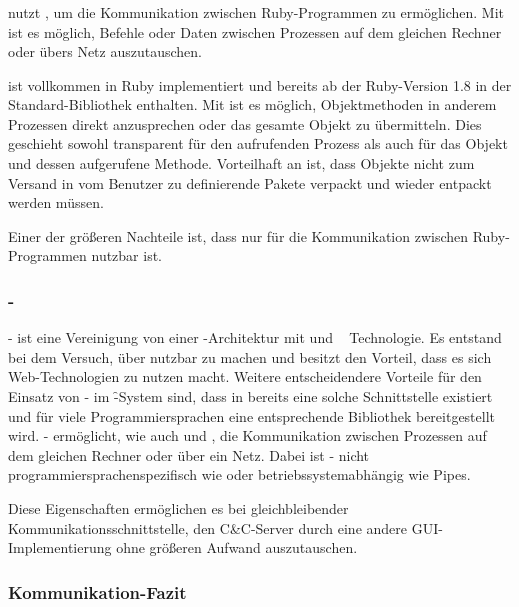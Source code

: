 \subsubsection*{}
\label{subsec:drb}

 nutzt , um die Kommunikation zwischen Ruby-Programmen zu
ermöglichen. Mit  ist es möglich, Befehle oder Daten zwischen
Prozessen auf dem gleichen Rechner oder übers Netz auszutauschen.

 ist vollkommen in Ruby implementiert und bereits ab der
Ruby-Version 1.8 in der Standard-Bibliothek enthalten. Mit 
ist es möglich, Objektmethoden in anderem Prozessen direkt
anzusprechen oder das gesamte Objekt zu übermitteln. Dies geschieht
sowohl transparent für den aufrufenden Prozess als auch für das Objekt
und dessen aufgerufene Methode. Vorteilhaft an  ist, dass
Objekte nicht zum Versand in vom Benutzer zu definierende Pakete
verpackt und wieder entpackt werden müssen.

Einer der größeren Nachteile ist, dass  nur für die Kommunikation
zwischen Ruby-Programmen nutzbar ist.

\subsubsection*{-}
\label{subsec:xmlrpc}

- ist eine Vereinigung von einer
-Architektur mit  und ~\cite{rfc2068}
Technologie. Es entstand bei dem Versuch,  über 
nutzbar zu machen und besitzt den Vorteil, dass es sich Web-Technologien
zu nutzen macht. Weitere entscheidendere Vorteile für den Einsatz von
- im \f-System sind, dass in  bereits eine
solche Schnittstelle existiert und für viele Programmiersprachen
eine entsprechende Bibliothek bereitgestellt wird. -
ermöglicht, wie auch  und , die Kommunikation
zwischen Prozessen auf dem gleichen Rechner oder über ein Netz. Dabei
ist - nicht programmiersprachenspezifisch wie
 oder betriebssystemabhängig wie Pipes.

Diese Eigenschaften ermöglichen es bei gleichbleibender
Kommunikationsschnittstelle, den C\&C-Server durch eine andere
GUI-Implementierung ohne größeren Aufwand auszutauschen.

\subsubsection*{Kommunikation-Fazit}

